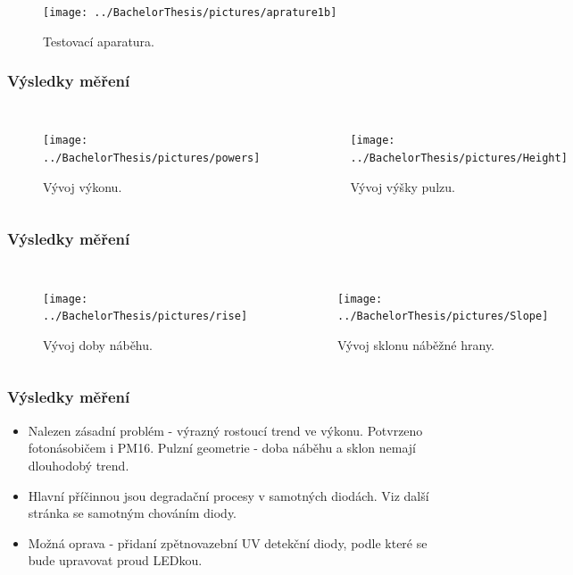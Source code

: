 \documentclass{beamer}
\begin{document}
\begin{frame}




 \begin{figure}[H]
 \centering
 \texttt{[image: ../BachelorThesis/pictures/aprature1b]}
 \caption{Testovací aparatura.}
 \label{UVsource}
\end{figure}


\end{frame}

\begin{frame}
\frametitle{Výsledky měření}
\begin{columns}[t]
\centering
\begin{figure}[H]
\texttt{[image: ../BachelorThesis/pictures/powers]}\\
\caption{Vývoj výkonu.}
\end{figure}
\centering
\begin{figure}[H]
\texttt{[image: ../BachelorThesis/pictures/Height]}\\
\caption{Vývoj výšky pulzu.}
\end{figure}
\end{columns}



\end{frame}



\begin{frame}
\frametitle{Výsledky měření}
\begin{columns}[t]
\centering
\begin{figure}[H]
\texttt{[image: ../BachelorThesis/pictures/rise]}\\
\caption{Vývoj doby náběhu.}
\end{figure}
\centering
\begin{figure}[H]
\texttt{[image: ../BachelorThesis/pictures/Slope]}
\caption{Vývoj sklonu náběžné hrany.}
\end{figure}
\end{columns}



\end{frame}




\begin{frame}
\frametitle{Výsledky měření}
\begin{itemize}
 \item Nalezen zásadní problém - výrazný rostoucí trend ve výkonu. Potvrzeno fotonásobičem i PM16. Pulzní geometrie - doba náběhu a sklon nemají dlouhodobý trend.
 \item Hlavní příčinnou jsou degradační procesy v samotných diodách. Viz další stránka se samotným chováním diody.
 \item Možná oprava - přidaní zpětnovazební UV detekční diody, podle které se bude upravovat proud LEDkou. 

\end{itemize}


\end{frame}
\end{document}
